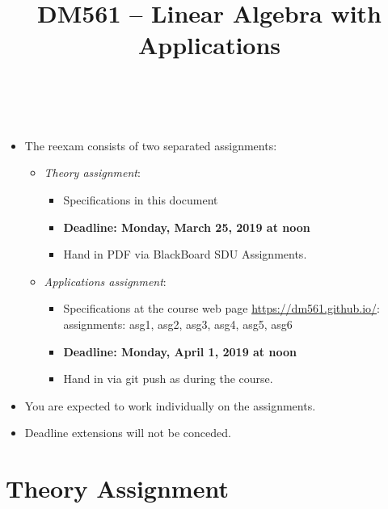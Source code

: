 \documentclass[a4paper,10pt]{article}
\title{%
\begin{flushleft}
DM561 -- Linear Algebra with Applications\\[0.3cm]
\hrulefill
\\[-1.8cm]
\end{flushleft}
}
\author{}
\date{}
\begin{document}
\maketitle








\medskip

\begin{itemize}

\itemsep=1ex

\item The reexam consists of two separated assignments:

\begin{itemize}

\item \emph{Theory assignment}:
  \begin{itemize}
\item Specifications in this document
\item {\bf Deadline: Monday, March 25, 2019 at noon}
\item Hand in PDF via BlackBoard SDU Assignments.
  \end{itemize}
  
\item \emph{Applications assignment}:
  \begin{itemize}
  \item Specifications at the course web page
    \url{https://dm561.github.io/}:\\ assignments: asg1, asg2, asg3, asg4,
    asg5, asg6
  \item {\bf Deadline: Monday, April 1, 2019 at noon}
  \item Hand in via git push as during the course.
  \end{itemize}
\end{itemize}
  


\item You are expected to work individually on the assignments.

  
\item Deadline extensions will not be conceded.
\end{itemize}


\clearpage

\section*{Theory Assignment}
\end{document}
